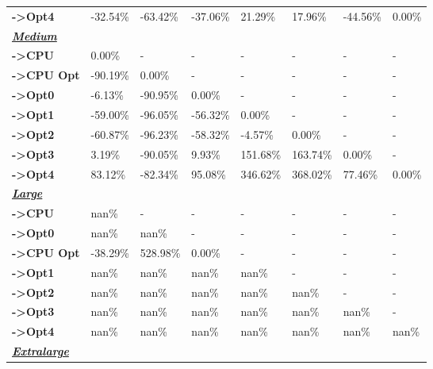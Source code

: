 \begin{table}[H]
\begin{tabular}{llllllll}
    \rowcolor[HTML]{EFEFEF} \cellcolor[HTML]{DAE8FC} \textbf{->Opt4} & -32.54\% & -63.42\% & -37.06\% & 21.29\% & 17.96\% & 	-44.56\% & 	0.00\% \\
    \cellcolor[HTML]{DAE8FC} \textbf{\textbf{{\emph{{\underline{{Medium}}}}}}} &  &  &  &  &  &  &  \\
    \rowcolor[HTML]{EFEFEF} \cellcolor[HTML]{DAE8FC} \textbf{->CPU} & 0.00\% & - & - & - & - & - & - \\
    \cellcolor[HTML]{DAE8FC} \textbf{->CPU Opt} & -90.19\% & 0.00\% & - & - & - & - & - \\
    \rowcolor[HTML]{EFEFEF} \cellcolor[HTML]{DAE8FC} \textbf{->Opt0} & -6.13\% & -90.95\% & 0.00\% & - & - & - & - \\
    \cellcolor[HTML]{DAE8FC} \textbf{->Opt1} & -59.00\% & -96.05\% & -56.32\% & 0.00\% & - & - & - \\
    \rowcolor[HTML]{EFEFEF} \cellcolor[HTML]{DAE8FC} \textbf{->Opt2} & -60.87\% & -96.23\% & -58.32\% & -4.57\% & 0.00\% & - & - \\
    \cellcolor[HTML]{DAE8FC} \textbf{->Opt3} & 3.19\% & -90.05\% & 9.93\% & 151.68\% & 163.74\% & 	0.00\% & - \\
    \rowcolor[HTML]{EFEFEF} \cellcolor[HTML]{DAE8FC} \textbf{->Opt4} & 83.12\% & -82.34\% & 95.08\% & 346.62\% & 368.02\% & 	77.46\% & 	0.00\% \\
    \cellcolor[HTML]{DAE8FC} \textbf{\textbf{{\emph{{\underline{{Large}}}}}}} &  &  &  &  &  &  &  \\
    \rowcolor[HTML]{EFEFEF} \cellcolor[HTML]{DAE8FC} \textbf{->CPU} & nan\% & - & - & - & - & - & - \\
    \cellcolor[HTML]{DAE8FC} \textbf{->Opt0} & nan\% & nan\% & - & - & - & - & - \\
    \rowcolor[HTML]{EFEFEF} \cellcolor[HTML]{DAE8FC} \textbf{->CPU Opt} & -38.29\% & 528.98\% & 0.00\% & - & - & - & - \\
    \cellcolor[HTML]{DAE8FC} \textbf{->Opt1} & nan\% & nan\% & nan\% & nan\% & - & - & - \\
    \rowcolor[HTML]{EFEFEF} \cellcolor[HTML]{DAE8FC} \textbf{->Opt2} & nan\% & nan\% & nan\% & nan\% & nan\% & - & - \\
    \cellcolor[HTML]{DAE8FC} \textbf{->Opt3} & nan\% & nan\% & nan\% & nan\% & nan\% & 	nan\% & - \\
    \rowcolor[HTML]{EFEFEF} \cellcolor[HTML]{DAE8FC} \textbf{->Opt4} & nan\% & nan\% & nan\% & nan\% & nan\% & 	nan\% & 	nan\% \\
    \cellcolor[HTML]{DAE8FC} \textbf{\textbf{{\emph{{\underline{{Extralarge}}}}}}} &  &  &  &  &  &  &  \\

\end{tabular}
\end{table}

